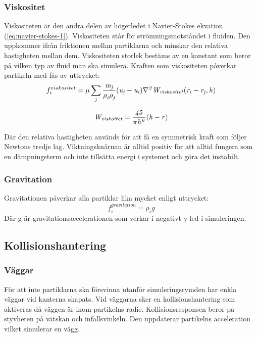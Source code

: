 \documentclass[a4paper,12pt,oneside,final]{extarticle}
\begin{document}
\subsubsection{Viskositet}
Viskositeten är den andra delen av högerledet i Navier-Stokes ekvation (\ref{eq:navier-stokes-1}).
Viskositeten står för strömningsmotståndet i fluiden.
Den uppkommer ifrån friktionen mellan partiklarna och minskar den relativa hastigheten mellan dem.
Viskositeten storlek bestäms av en konstant som beror på vilken typ av fluid man ska simulera.
Kraften som viskositeten påverkar partikeln med fås av uttrycket:
\begin{equation}
f^{viskositet}_i = \mu \sum_{j} {\it \frac{m_j}{\rho^{}_{i} \rho^{}_{j}} (u_j - u_i) \nabla^{2}_{} W_{viskositet} (r_i - r_j,h)}
\end{equation}

\begin{equation}
{\it W_{viskoitet} = \frac{45}{\pi h^6} {(h-r)}}
\end{equation}

Där den relativa hastigheten används för att få en symmetrisk kraft som följer Newtons tredje lag. Viktningsknärnan är alltid positiv för att alltid fungera som en dämpningsterm och inte tillsätta energi i systemet och göra det instabilt. 

\subsubsection{Gravitation}
Gravitationen påverkar alla partiklar lika mycket enligt uttrycket:
\begin{equation}
f^{gravitation}_{i} = \rho^{}_{i}g
\end{equation}
Där g är gravitationsaccelerationen som verkar i negativt y-led i simuleringen.

\subsection{Kollisionshantering}
\subsubsection{Väggar}
För att inte partiklarna ska försvinna utanför simuleringsrymden har enkla väggar vid kanterna skapats.
Vid väggarna sker en kollisionshantering som aktiveras då väggen är inom partikelns radie.
Kollisionsresponsen beror på styvheten på vätskan och infallsvinkeln.
Den uppdaterar partikelns acceleration vilket simulerar en vägg.
\end{document}

